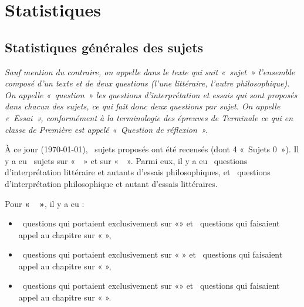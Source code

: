 \setcounter{chapter}{1}\setcounter{section}{0}\setcounter{subsection}{0}
\chapter{Statistiques}
\label{statistiques}\hypertarget{statistiques}{}
\compteursfinauxexamens

\section{Statistiques générales des sujets}

\begin{footnotesize}{\textit{Sauf mention du contraire, on appelle dans le texte qui suit «~sujet~»{} l'ensemble composé d'un texte et de deux questions (l'une littéraire, l'autre philosophique). On appelle «~question~»{} les questions d'interprétation et essais qui sont proposés dans chacun des sujets, ce qui fait donc deux questions par sujet. On appelle «~Essai~»{}, conformément à la terminologie des épreuves de Terminale ce qui en classe de Première est appelé «~Question de réflexion~»{}.}}\end{footnotesize}

\vspace{3pt}

À ce jour (\today), \textbf{}~sujets proposés ont été recensés (dont 4 «~Sujets 0~»). Il y a eu \textbf{}~sujets sur «~\RS{}~» et \textbf{} sur «~\HQ{}~». Parmi eux, il y a eu ~questions d'interprétation littéraire et autants d'essais philosophiques, et ~questions d'interprétation philosophique et autant d'essais littéraires.

Pour \textbf{«~\RS{}~»{}}, il y a eu :\setlength{\itemsep}{2pt}

\vspace*{-14pt}

\begin{itemize}
\item {}~questions qui portaient exclusivement sur «\ETA{}»{} et ~questions qui faisaient appel au chapitre sur « \ETA{} »{},
\item {}~questions qui portaient exclusivement sur « \EXS{}»{} et ~questions qui faisaient appel au chapitre sur « \EXS{}»{},
\item {}~questions qui portaient exclusivement sur «\MM{}»{} et ~questions qui faisaient appel au chapitre sur « \MM{} »{}. 
\end{itemize}

